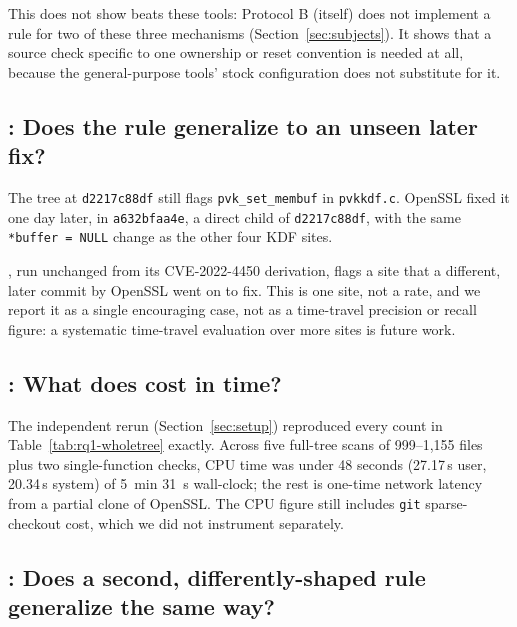 This does not show \tool beats these tools: Protocol B (\tool itself) does
not implement a rule for two of these three mechanisms
(Section~\ref{sec:subjects}). It shows that a source check specific to one
ownership or reset convention is needed at all, because the general-purpose
tools' stock configuration does not substitute for it.

\subsection{: Does the rule generalize to an unseen later fix?}
\label{sec:rq3}

The tree at \texttt{d2217c88df} still flags \texttt{pvk\_set\_membuf} in
\texttt{pvkkdf.c}. OpenSSL fixed it one day later, in \texttt{a632bfaa4e},
a direct child of \texttt{d2217c88df}, with the same \texttt{*buffer =
NULL} change as the other four KDF sites.

\begin{observation}
\label{obs:rq3-timetravel}
\tool, run unchanged from its CVE-2022-4450 derivation, flags a site that a
different, later commit by OpenSSL went on to fix. This is one site, not a
rate, and we report it as a single encouraging case, not as a time-travel
precision or recall figure: a systematic time-travel evaluation over more
sites is future work.
\end{observation}

\subsection{: What does \tool cost in time?}
\label{sec:rq4}

\begin{observation}
\label{obs:rq4-cost}
The independent rerun (Section~\ref{sec:setup}) reproduced every count in
Table~\ref{tab:rq1-wholetree} exactly. Across five full-tree scans of
999--1{,}155 files plus two single-function checks, CPU time was under 48
seconds (27.17\,s user, 20.34\,s system) of 5~min 31~s wall-clock; the rest
is one-time network latency from a partial clone of OpenSSL. The CPU figure
still includes \texttt{git} sparse-checkout cost, which we did not
instrument separately.
\end{observation}

\subsection{: Does a second, differently-shaped rule generalize the same way?}
\label{sec:rq5}

